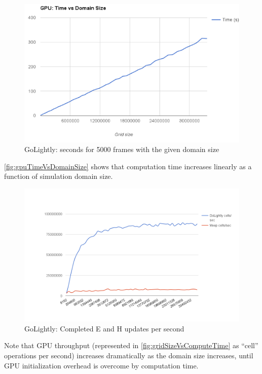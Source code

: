 \begin{figure}[H]
	\centering
	\includegraphics[width=\textwidth,
	keepaspectratio]{gpu_time_vs_domain_size.png}
	\caption{GoLightly: seconds for 5000 frames with the given domain size}
	\label{fig:gpuTimeVsDomainSize}
\end{figure}

\autoref{fig:gpuTimeVsDomainSize} shows that computation time increases linearly as a function of simulation domain size.


\begin{figure}[H]
	\centering
	\includegraphics[width=\textwidth,
	keepaspectratio]{cells-per-second.png}
	\caption{GoLightly: Completed E and H updates per second}
	\label{fig:gridSizeVsComputeTime}
\end{figure}

Note that GPU throughput (represented in \autoref{fig:gridSizeVsComputeTime} as “cell” operations per second) increases dramatically as the domain size increases, until GPU initialization overhead is overcome by computation time.

